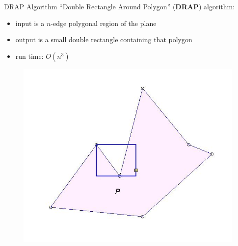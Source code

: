 \documentclass[10pt]{beamer}
\begin{document}
\begin{frame} {DRAP Algorithm}
  ``Double Rectangle Around Polygon'' (\textbf{DRAP}) algorithm:\\
  \begin{itemize}
  \item input is a $n$-edge polygonal region of the plane
  \item output is a small double rectangle containing that polygon
  \item run time: $O(n^3)$
  \end{itemize}
  \begin{figure}
    \includegraphics[scale=0.3]{figs/drap1.jpg}
  \end{figure}
\end{frame}
\end{document}
